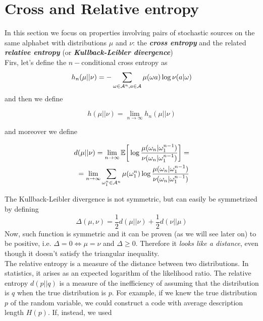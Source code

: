 \section{Cross and Relative entropy}
In this section we focus on properties involving pairs of stochastic sources
on the same alphabet with distributions  $\mu$ and $\nu$: the \textbf{\textit{cross entropy}} and the related \textbf{\textit{relative entropy}} (or \textbf{\textit{Kullback-Leibler divergence}})
\\Firs, let's define the $n-$conditional cross entropy as
\begin{equation}
    h_n(\mu || \nu) = - \sum_{\omega \in \mathcal{A}^n, a \in \mathcal{A}} \mu(\omega a) \log \nu(a| \omega)
\end{equation}
and then we define
\begin{definition}
    \begin{equation}
        h(\mu || \nu) = \lim_{n \rightarrow \infty} h_n(\mu || \nu)
    \end{equation}
\end{definition}
and moreover we define 
\begin{definition}
    \begin{align}
        d(\mu || \nu) = \lim_{n \rightarrow \infty} \mathbb{E} \bigg[ \log \frac{\mu(\omega_n|\omega_1^{n-1})}{\nu(\omega_n|\omega_1^{n-1})} \bigg] = \\ = \lim_{n \rightarrow \infty} \sum_{\omega_1^n \in \mathcal{A}^n} \mu(\omega_1^n) \log \frac{\mu(\omega_n|\omega_1^{n-1})}{\nu(\omega_n|\omega_1^{n-1})}
    \end{align}
\end{definition}
The Kullback-Leibler divergence is not symmetric, but can easily be symmetrized by defining
\begin{equation}
    \Delta(\mu, \nu) = \frac{1}{2} d(\mu || \nu) +  \frac{1}{2} d(\nu || \mu) 
\end{equation}
Now, such function is symmetric and it can be proven (as we will see later on) to be positive, i.e. $\Delta=0 \Leftrightarrow \mu = \nu$ and $\Delta \geq 0$. Therefore it \textit{looks like a distance}, even though it doesn't satisfy the triangular inequality. 
\\The relative entropy is a measure of the distance between two distributions. In statistics, it arises as an expected logarithm of the likelihood ratio.
The relative entropy $d(p||q)$ is a measure of the inefficiency of assuming
that the distribution is $q$ when the true distribution is $p$. For example, if we knew the true distribution $p$ of the random variable, we could construct a code with average description length $H (p)$. If, instead, we used
